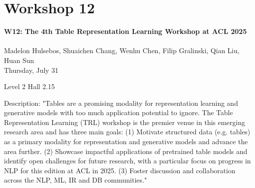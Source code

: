 \clearpage



\section[W12: The 4th Table Representation Learning Workshop at ACL 2025]{Workshop 12}
\label{workshop_12}

\begin{center}
    {\Large \textbf{W12: The 4th Table Representation Learning Workshop at ACL 2025}}\\
    
\\
   Madelon Hulsebos, Shuaichen Chang, Wenhu Chen, Filip Gralinski, Qian Liu, Huan Sun\\

    Thursday, July 31
    
   Level 2 Hall 2.15

\end{center}

Description: "Tables are a promising modality for representation learning and generative models with too much application potential to ignore. The Table Representation Learning (TRL) workshop is the premier venue in this emerging research area and has three main goals:
(1) Motivate structured data (e.g. tables) as a primary modality for representation and generative models and advance the area further.
(2) Showcase impactful applications of pretrained table models and identify open challenges for future research, with a particular focus on progress in NLP for this edition at ACL in 2025.
(3) Foster discussion and collaboration across the NLP, ML, IR and DB communities."


